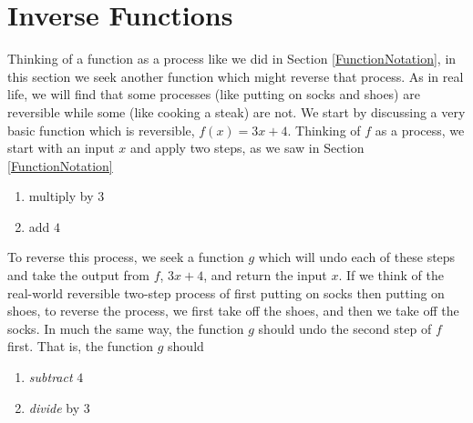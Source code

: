 \section{Inverse Functions}

\label{InverseFunctions}

Thinking of a function as a process like we did in Section \ref{FunctionNotation}, in this section we seek another function which might reverse that process.  As in real life, we will find that some processes (like putting on socks and shoes) are reversible while some (like cooking a steak) are not.  We start by discussing a very basic function which is reversible, $f(x) = 3x+4$.  Thinking of $f$ as a process, we start with an input $x$ and apply two steps, as we saw in Section \ref{FunctionNotation} 

\begin{enumerate}

\item multiply by $3$ 

\item add $4$ 

\end{enumerate}

To reverse this process, we seek a function $g$ which will undo each of these steps and take the output from $f$, $3x+4$, and return the input $x$.  If we think of the real-world reversible two-step process of first putting on socks then putting on shoes, to reverse the process, we first take off the shoes, and then we take off the socks.  In much the same way, the function $g$ should undo the second step of $f$ first.  That is, the function $g$ should

\begin{enumerate}

\item  \textit{subtract} $4$ 

\item  \textit{divide} by $3$

\end{enumerate}

